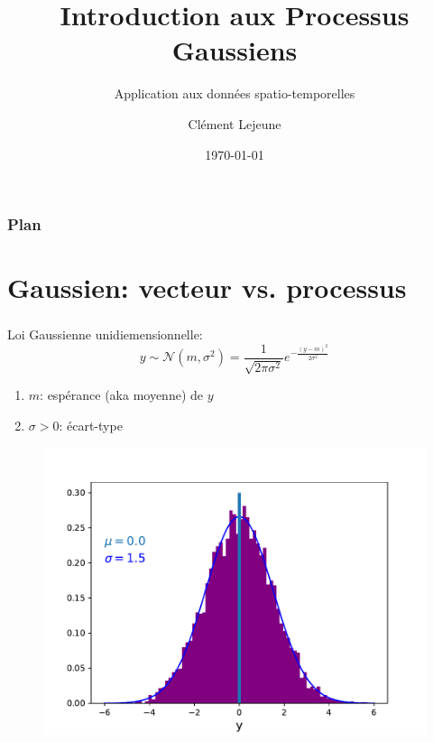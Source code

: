 \documentclass[xcolor=svgnames, t]{beamer}
\title[Introduction aux Processus Gaussiens]{Introduction aux Processus Gaussiens}
\subtitle{Application aux données spatio-temporelles}
\institute[]{}
\author[Cl\'ement Lejeune]{Cl\'ement Lejeune}
\institute[TSN/AD/AD3/IA]{
Thales Services Numériques,
\\ AD/AD3/IA
}
\date{\today}
\begin{document}
\frame{\titlepage}

{
  \begin{frame}
    \frametitle{Plan}
    \tableofcontents[currentsection]
  \end{frame}
}

\section{Gaussien: vecteur vs. processus}
\begin{frame}
  \frametitle{\secname}
% 
  Loi Gaussienne unidiemensionnelle:
  \begin{equation*}
    y \sim \mathcal{N}(m, \sigma^2) = \frac{1}{\sqrt{2 \pi \sigma^2}} e^{-\frac{(y-m)^2}{2 \sigma^2}}
  \end{equation*}

  \begin{enumerate}
    \item $m$: espérance (aka moyenne) de $y$
    \item $\sigma > 0$: écart-type
  \end{enumerate}


  \begin{figure}
    \includegraphics[scale=0.4]{gaussian_1d.pdf}
  \end{figure}
\end{frame}
\end{document}
